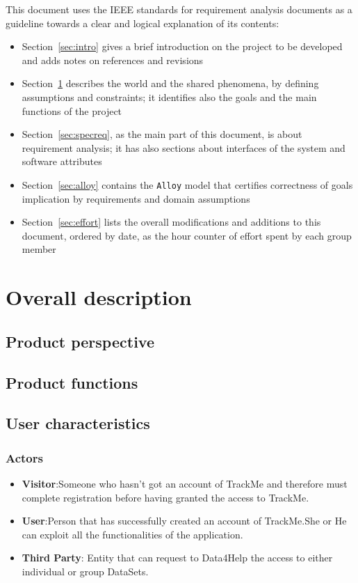 \documentclass[12pt]{article}
\begin{document}
    This document uses the IEEE standards for requirement analysis documents as a guideline towards a clear and logical explanation of its contents:
    \begin{itemize}
      \item Section~\ref{sec:intro} gives a brief introduction on the project to be developed and adds notes on references and revisions
      \item Section~\ref{sec:overdesc} describes the world and the shared phenomena, by defining assumptions and constraints; it identifies also the goals and the main functions of the project
      \item Section~\ref{sec:specreq}, as the main part of this document, is about requirement analysis; it has also sections about interfaces of the system and software attributes
      \item Section~\ref{sec:alloy} contains the \texttt{Alloy} model that certifies correctness of goals implication by requirements and domain assumptions
      \item Section~\ref{sec:effort} lists the overall modifications and additions to this document, ordered by date, as the hour counter of effort spent by each group member
    \end{itemize}

\clearpage
\section{Overall description}
\label{sec:overdesc}

  \subsection{Product perspective}
  \subsection{Product functions}
  \subsection{User characteristics}
 \subsubsection{Actors}
\begin{itemize}
\item \textbf{Visitor}:Someone who hasn't got an account of TrackMe and therefore must complete registration before having granted the access to TrackMe.
\item \textbf{User}:Person that has successfully created an account of TrackMe.She or He can exploit all the functionalities of the application.
\item  \textbf{Third Party}: Entity that can request to Data4Help  the access  to either individual or group DataSets.
\end{itemize} 
\end{document}
